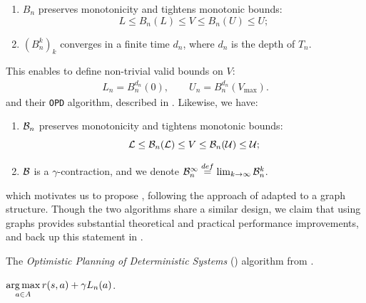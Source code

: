 \documentclass[runningheads]{llncs}
\begin{document}
\begin{lemma}[Properties of $B_n$]
	\label{lem:properties-b-tree}
	\begin{enumerate}[label=(\roman*)]
		\item $B_n$ preserves monotonicity and tightens monotonic bounds: $$
		L \leq B_n(L) \leq V \leq B_n(U) \leq U;
		$$
		\item $(B_n^k)_k$ converges in a finite time $d_n$, where $d_n$ is the depth of $T_n$. 
	\end{enumerate}
\end{lemma}
This enables \citet{Hren2008optimistic} to define non-trivial valid bounds on $V$:
\begin{align}
L_n = B_n^{d_n}(0), \qquad U_n = B_n^{d_n}(V_{\max}).
\end{align}
and their \texttt{OPD} algorithm, described in . Likewise, we have:
\begin{lemma}[Properties of $\cB_n$]
	\label{lem:properties-b-graph}
	\begin{enumerate}[label=(\roman*)]
		\item $\cB_n$ preserves monotonicity and tightens monotonic bounds: $$
		\mathcal{L} \leq \mathcal{B}_n(\mathcal{L}) \leq V \leq \mathcal{B}_n(\mathcal{U}) \leq \mathcal{U};
		$$
		\item $\mathcal{B}$ is a $\gamma$-contraction, and we denote $\mathcal{B}_n^{\infty} \stackrel{def}{=} \lim_{k\rightarrow \infty} \mathcal{B}_n^k$.
	\end{enumerate}
\end{lemma}
which motivates us to propose , following the approach of  adapted to a graph structure. Though the two algorithms share a similar design, we claim that using graphs provides substantial theoretical and practical performance improvements, and back up this statement in .

\begin{algorithm}[th]
	\caption{The \emph{Optimistic Planning of Deterministic Systems} (\OPD) algorithm from \citep{Hren2008optimistic}.}
	\label{alg:opd}
	\DontPrintSemicolon
	\Return $\displaystyle\operatorname*{arg\,max}_{a\in A} r(s, a) + \gamma L_n(a)$. \;
\end{algorithm}
\end{document}
